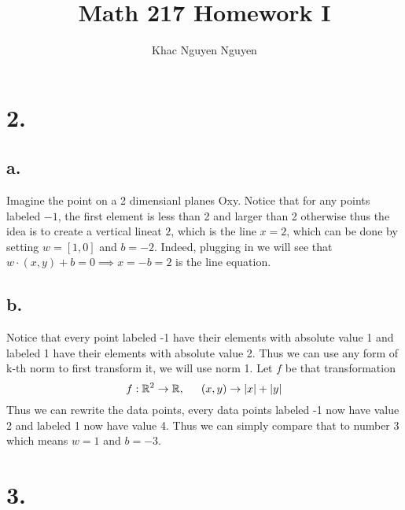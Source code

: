 \documentclass[11pt]{article}
\title{\textbf{Math 217 Homework I}}
\author{Khac Nguyen Nguyen}
\date{}
\theoremstyle{mystyle}
\theoremstyle{definition}
\begin{document}
\section*{2.}
\subsection*{a.}
Imagine the point on a 2 dimensianl planes Oxy. Notice that for any points labeled $-1$, the first element is less than 2 and larger than 2 otherwise thus the idea is to create a vertical lineat $2$, which is the line $x = 2$, which can be done by setting $w = [1,0]$ and $b = -2$. Indeed, plugging in we will see that $ w \cdot (x, y) + b = 0 \implies x = -b = 2$ is the line equation.
\subsection*{b.}
Notice that every point labeled -1 have their elements with absolute value 1 and labeled 1 have their elements with absolute value 2. Thus we can use any form of k-th norm to first transform it, we will use norm 1. Let $f$ be that transformation
\[
  f: \mathbb{R}^2 \to \mathbb{R}, \indent (x,y) \to |x| + |y| 
\]
Thus we can rewrite the data points, every data points labeled -1 now have value 2 and labeled 1 now have value 4. Thus we can simply compare that to number 3 which means $w = 1$ and $b = -3$.
\section*{3.}
\end{document}
